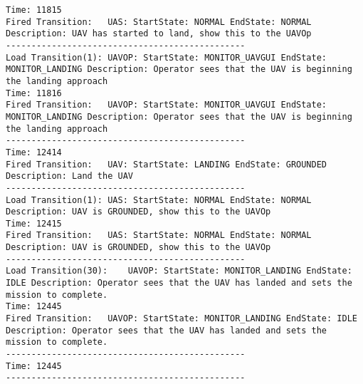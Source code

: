 \begin{spacing}{1}
\begin{verbatim}
Time: 11815
Fired Transition:	UAS: StartState: NORMAL EndState: NORMAL Description: UAV has started to land, show this to the UAVOp
-----------------------------------------------
Load Transition(1):	UAVOP: StartState: MONITOR_UAVGUI EndState: MONITOR_LANDING Description: Operator sees that the UAV is beginning the landing approach
Time: 11816
Fired Transition:	UAVOP: StartState: MONITOR_UAVGUI EndState: MONITOR_LANDING Description: Operator sees that the UAV is beginning the landing approach
-----------------------------------------------
Time: 12414
Fired Transition:	UAV: StartState: LANDING EndState: GROUNDED Description: Land the UAV
-----------------------------------------------
Load Transition(1):	UAS: StartState: NORMAL EndState: NORMAL Description: UAV is GROUNDED, show this to the UAVOp
Time: 12415
Fired Transition:	UAS: StartState: NORMAL EndState: NORMAL Description: UAV is GROUNDED, show this to the UAVOp
-----------------------------------------------
Load Transition(30):	UAVOP: StartState: MONITOR_LANDING EndState: IDLE Description: Operator sees that the UAV has landed and sets the mission to complete.
Time: 12445
Fired Transition:	UAVOP: StartState: MONITOR_LANDING EndState: IDLE Description: Operator sees that the UAV has landed and sets the mission to complete.
-----------------------------------------------
Time: 12445
-----------------------------------------------
\end{verbatim}
\end{spacing}
